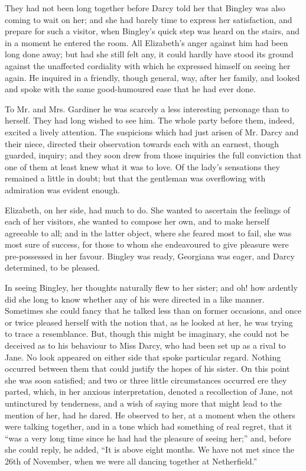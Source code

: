 They had not been long together before Darcy told her that Bingley was also coming to wait on her; and she had barely time to express her satisfaction, and prepare for such a visitor, when Bingley's quick step was heard on the stairs, and in a moment he entered the room. All Elizabeth's anger against him had been long done away; but had she still felt any, it could hardly have stood its ground against the unaffected cordiality with which he expressed himself on seeing her again. He inquired in a friendly, though general, way, after her family, and looked and spoke with the same good-humoured ease that he had ever done.

To Mr. and Mrs. Gardiner he was scarcely a less interesting personage than to herself. They had long wished to see him. The whole party before them, indeed, excited a lively attention. The suspicions which had just arisen of Mr. Darcy and their niece, directed their observation towards each with an earnest, though guarded, inquiry; and they soon drew from those inquiries the full conviction that one of them at least knew what it was to love. Of the lady's sensations they remained a little in doubt; but that the gentleman was overflowing with admiration was evident enough.

Elizabeth, on her side, had much to do. She wanted to ascertain the feelings of each of her visitors, she wanted to compose her own, and to make herself agreeable to all; and in the latter object, where she feared most to fail, she was most sure of success, for those to whom she endeavoured to give pleasure were pre-possessed in her favour. Bingley was ready, Georgiana was eager, and Darcy determined, to be pleased.



In seeing Bingley, her thoughts naturally flew to her sister; and oh! how ardently did she long to know whether any of his were directed in a like manner. Sometimes she could fancy that he talked less than on former occasions, and once or twice pleased herself with the notion that, as he looked at her, he was trying to trace a resemblance. But, though this might be imaginary, she could not be deceived as to his behaviour to Miss Darcy, who had been set up as a rival to Jane. No look appeared on either side that spoke particular regard. Nothing occurred between them that could justify the hopes of his sister. On this point she was soon satisfied; and two or three little circumstances occurred ere they parted, which, in her anxious interpretation, denoted a recollection of Jane, not untinctured by tenderness, and a wish of saying more that might lead to the mention of her, had he dared. He observed to her, at a moment when the others were talking together, and in a tone which had something of real regret, that it ``was a very long time since he had had the pleasure of seeing her;'' and, before she could reply, he added, ``It is above eight months. We have not met since the 26th of November, when we were all dancing together at Netherfield.''

